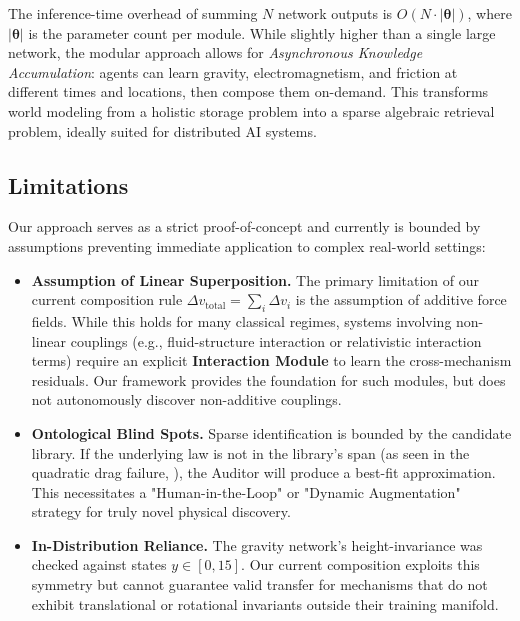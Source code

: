 \documentclass[twoside,11pt]{article}
\begin{document}
The inference-time overhead of summing $N$ network outputs is $O(N \cdot |\boldsymbol{\theta}|)$, where $|\boldsymbol{\theta}|$ is the parameter count per module. While slightly higher than a single large network, the modular approach allows for \emph{Asynchronous Knowledge Accumulation}: agents can learn gravity, electromagnetism, and friction at different times and locations, then compose them on-demand. This transforms world modeling from a holistic storage problem into a sparse algebraic retrieval problem, ideally suited for distributed AI systems.

\subsection{Limitations}

Our approach serves as a strict proof-of-concept and currently is bounded by assumptions preventing immediate application to complex real-world settings:
\begin{itemize}
    \item \textbf{Assumption of Linear Superposition.} The primary limitation of our current composition rule $\Delta v_{\text{total}} = \sum_i \Delta v_i$ is the assumption of additive force fields. While this holds for many classical regimes, systems involving non-linear couplings (e.g., fluid-structure interaction or relativistic interaction terms) require an explicit \textbf{Interaction Module} to learn the cross-mechanism residuals. Our framework provides the foundation for such modules, but does not autonomously discover non-additive couplings.
    \item \textbf{Ontological Blind Spots.} Sparse identification is bounded by the candidate library. If the underlying law is not in the library's span (as seen in the quadratic drag failure, ), the Auditor will produce a best-fit approximation. This necessitates a "Human-in-the-Loop" or "Dynamic Augmentation" strategy for truly novel physical discovery.
    \item \textbf{In-Distribution Reliance.} The gravity network's height-invariance was checked against states $y \in [0, 15]$. Our current composition exploits this symmetry but cannot guarantee valid transfer for mechanisms that do not exhibit translational or rotational invariants outside their training manifold.
\end{itemize}
\end{document}

